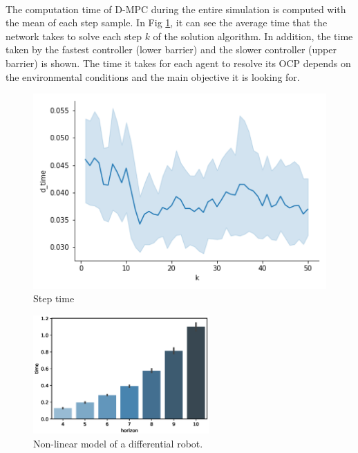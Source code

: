\\

\vspace{0.5cm}
The computation time of D-MPC during the entire simulation is computed with the mean of each step sample. In Fig \ref{Step_time_no_rest}, it can see the average time that the network takes to solve each step $k$ of the solution algorithm. In addition, the time taken by the fastest controller (lower barrier) and the slower controller (upper barrier) is shown. The time it takes for each agent to resolve its OCP depends on the environmental conditions and the main objective it is looking for.
\\
\begin{figure}[H]
\centering
    \includegraphics[width=.6\textwidth]{Kap6/no_restricted/no_restricted_d_time.png}
    \caption{Step time}
        \label{Step_time_no_rest}
\end{figure}




\begin{figure}[h!]
\centering
    \includegraphics[width=0.6\textwidth]{Kap6/no_restricted/no_restricted_horizon_time.eps}
    \caption{Non-linear model of a differential robot.}
\end{figure}

